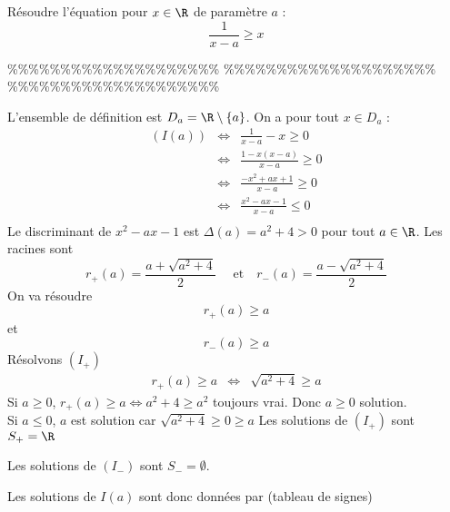 



\begin{exercice}
Résoudre l'équation pour $x\in \R$ de paramètre $a$  : 
$$\frac{1}{x-a} \geq x$$
\end{exercice}


\%\%\%\%\%\%\%\%\%\%\%\%\%\%\%\%\%\%\%\%
\%\%\%\%\%\%\%\%\%\%\%\%\%\%\%\%\%\%\%\%
\%\%\%\%\%\%\%\%\%\%\%\%\%\%\%\%\%\%\%\%




\begin{correction}
L'ensemble de définition est $D_a= \R\setminus \{ a\}$. 
On a pour tout $x\in D_a$ : 
\begin{eqnarray*}
(I(a))  &\Longleftrightarrow &\frac{1}{x-a}  -x  \geq 0\\
	&\Longleftrightarrow &\frac{1-x(x-a)}{x-a}  \geq 0\\
	&\Longleftrightarrow &\frac{- x^2 + ax+1}{x-a}  \geq 0\\
	&\Longleftrightarrow &\frac{x^2-ax-1}{x-a}  \leq 0 \\
\end{eqnarray*}
Le discriminant de $x^2-ax-1$ est $\Delta(a) = a^2+4>0$ pour tout $a\in \R$. 
Les racines sont 
$$r_+ (a) = \frac{a+\sqrt{a^2+4}}{2} \quad \text{ et} \quad r_- (a) = \frac{a-\sqrt{a^2+4}}{2} $$
On va résoudre
\begin{equation}\tag{$I_+$}
r_+(a) \geq a 
\end{equation} 
 et 
\begin{equation}\tag{$I_-$}
r_-(a) \geq a
\end{equation} 
Résolvons $(I_+)$
\begin{eqnarray}
r_+(a) \geq a &\Longleftrightarrow & \sqrt{a^2+4} \geq a
\end{eqnarray}
Si $a\geq 0$, $ r_+(a) \geq a \Longleftrightarrow  a^2+4 \geq a^2$ toujours vrai. Donc $a\geq 0 $ solution. \\
Si $a\leq 0$, $a$ est solution car $ \sqrt{a^2+4} \geq 0\geq a$
Les solutions de $(I_+)$ sont $S_+=\R$


Les solutions de $(I_-)$ sont $S_-=\emptyset$.


Les solutions de $I(a)$ sont donc données par (tableau de signes)
\conclusion{$]-\infty, r_-(a)]\cup ]a, r_+(a)]$)}

\end{correction}